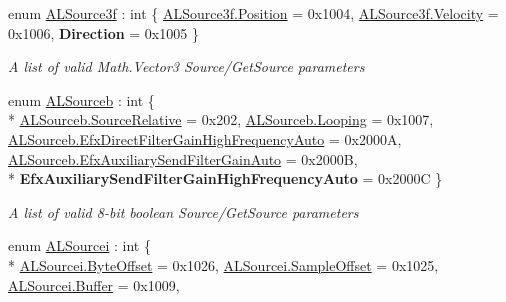 \begin{DoxyCompactItemize}
enum \hyperlink{namespace_open_t_k_1_1_audio_1_1_open_a_l_a6c1ca07b104dd956910ef7cc10caa9ec}{A\-L\-Source3f} \-: int \{ \hyperlink{namespace_open_t_k_1_1_audio_1_1_open_a_l_a6c1ca07b104dd956910ef7cc10caa9eca52f5e0bc3859bc5f5e25130b6c7e8881}{A\-L\-Source3f.\-Position} = 0x1004, 
\hyperlink{namespace_open_t_k_1_1_audio_1_1_open_a_l_a6c1ca07b104dd956910ef7cc10caa9eca88156d46910a2d733443c339a9231d12}{A\-L\-Source3f.\-Velocity} = 0x1006, 
{\bfseries Direction} = 0x1005
 \}
\begin{DoxyCompactList}\small\item\em A list of valid Math.\-Vector3 Source/\-Get\-Source parameters\end{DoxyCompactList}\item 
enum \hyperlink{namespace_open_t_k_1_1_audio_1_1_open_a_l_ab6ee1a1f6b513b5681a01359b8aaf3c3}{A\-L\-Sourceb} \-: int \{ \\*
\hyperlink{namespace_open_t_k_1_1_audio_1_1_open_a_l_ab6ee1a1f6b513b5681a01359b8aaf3c3a7a76eeabe697cda6ba8efe804d1cfdac}{A\-L\-Sourceb.\-Source\-Relative} = 0x202, 
\hyperlink{namespace_open_t_k_1_1_audio_1_1_open_a_l_ab6ee1a1f6b513b5681a01359b8aaf3c3aa56d66d7acdce18b9861f4c84bf8f777}{A\-L\-Sourceb.\-Looping} = 0x1007, 
\hyperlink{namespace_open_t_k_1_1_audio_1_1_open_a_l_ab6ee1a1f6b513b5681a01359b8aaf3c3a08b9f691f34d246146f91be2fa729313}{A\-L\-Sourceb.\-Efx\-Direct\-Filter\-Gain\-High\-Frequency\-Auto} = 0x2000\-A, 
\hyperlink{namespace_open_t_k_1_1_audio_1_1_open_a_l_ab6ee1a1f6b513b5681a01359b8aaf3c3a4240cc97f0fe8102e816f6a5040810d1}{A\-L\-Sourceb.\-Efx\-Auxiliary\-Send\-Filter\-Gain\-Auto} = 0x2000\-B, 
\\*
{\bfseries Efx\-Auxiliary\-Send\-Filter\-Gain\-High\-Frequency\-Auto} = 0x2000\-C
 \}
\begin{DoxyCompactList}\small\item\em A list of valid 8-\/bit boolean Source/\-Get\-Source parameters\end{DoxyCompactList}\item 
enum \hyperlink{namespace_open_t_k_1_1_audio_1_1_open_a_l_a364b4250b263feec3ed248be5b6a3117}{A\-L\-Sourcei} \-: int \{ \\*
\hyperlink{namespace_open_t_k_1_1_audio_1_1_open_a_l_a364b4250b263feec3ed248be5b6a3117a511cf6f133343126fd2e4d66ceb11697}{A\-L\-Sourcei.\-Byte\-Offset} = 0x1026, 
\hyperlink{namespace_open_t_k_1_1_audio_1_1_open_a_l_a364b4250b263feec3ed248be5b6a3117af77505cd3681a499d34acfed3a6e049e}{A\-L\-Sourcei.\-Sample\-Offset} = 0x1025, 
\hyperlink{namespace_open_t_k_1_1_audio_1_1_open_a_l_a364b4250b263feec3ed248be5b6a3117a7e62bc342f41c946868f0ea6f0b712d8}{A\-L\-Sourcei.\-Buffer} = 0x1009, 

\end{DoxyCompactItemize}
